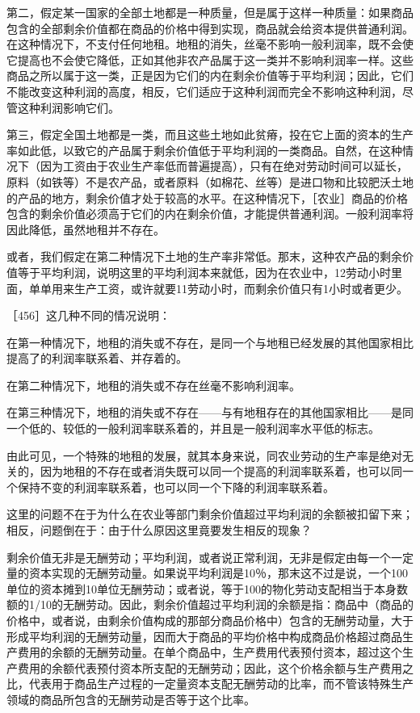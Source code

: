 第二，假定某一国家的全部土地都是一种质量，但是属于这样一种质量：如果商品包含的全部剩余价值都在商品的价格中得到实现，商品就会给资本提供普通利润。在这种情况下，不支付任何地租。地租的消失，丝毫不影响一般利润率，既不会使它提高也不会使它降低，正如其他非农产品属于这一类并不影响利润率一样。这些商品之所以属于这一类，正是因为它们的内在剩余价值等于平均利润；因此，它们不能改变这种利润的高度，相反，它们适应于这种利润而完全不影响这种利润，尽管这种利润影响它们。

第三，假定全国土地都是一类，而且这些土地如此贫瘠，投在它上面的资本的生产率如此低，以致它的产品属于剩余价值低于平均利润的一类商品。自然，在这种情况下（因为工资由于农业生产率低而普遍提高），只有在绝对劳动时间可以延长，原料（如铁等）不是农产品，或者原料（如棉花、丝等）是进口物和比较肥沃土地的产品的地方，剩余价值才处于较高的水平。在这种情况下，［农业］商品的价格包含的剩余价值必须高于它们的内在剩余价值，才能提供普通利润。一般利润率将因此降低，虽然地租并不存在。

或者，我们假定在第二种情况下土地的生产率非常低。那末，这种农产品的剩余价值等于平均利润，说明这里的平均利润本来就低，因为在农业中，12劳动小时里面，单单用来生产工资，或许就要11劳动小时，而剩余价值只有1小时或者更少。

［456］这几种不同的情况说明：

在第一种情况下，地租的消失或不存在，是同一个与地租已经发展的其他国家相比提高了的利润率联系着、并存着的。

在第二种情况下，地租的消失或不存在丝毫不影响利润率。

在第三种情况下，地租的消失或不存在——与有地租存在的其他国家相比——是同一个低的、较低的一般利润率联系着的，并且是一般利润率水平低的标志。

由此可见，一个特殊的地租的发展，就其本身来说，同农业劳动的生产率是绝对无关的，因为地租的不存在或者消失既可以同一个提高的利润率联系着，也可以同一个保持不变的利润率联系着，也可以同一个下降的利润率联系着。

这里的问题不在于为什么在农业等部门剩余价值超过平均利润的余额被扣留下来；相反，问题倒在于：由于什么原因这里竟要发生相反的现象？

剩余价值无非是无酬劳动；平均利润，或者说正常利润，无非是假定由每一个一定量的资本实现的无酬劳动量。如果说平均利润是10％，那末这不过是说，一个100单位的资本摊到10单位无酬劳动；或者说，等于100的物化劳动支配相当于本身数额的1/10的无酬劳动。因此，剩余价值超过平均利润的余额是指：商品中（商品的价格中，或者说，由剩余价值构成的那部分商品价格中）包含的无酬劳动量，大于形成平均利润的无酬劳动量，因而大于商品的平均价格中构成商品价格超过商品生产费用的余额的无酬劳动量。在单个商品中，生产费用代表预付资本，超过这个生产费用的余额代表预付资本所支配的无酬劳动；因此，这个价格余额与生产费用之比，代表用于商品生产过程的一定量资本支配无酬劳动的比率，而不管该特殊生产领域的商品所包含的无酬劳动是否等于这个比率。

